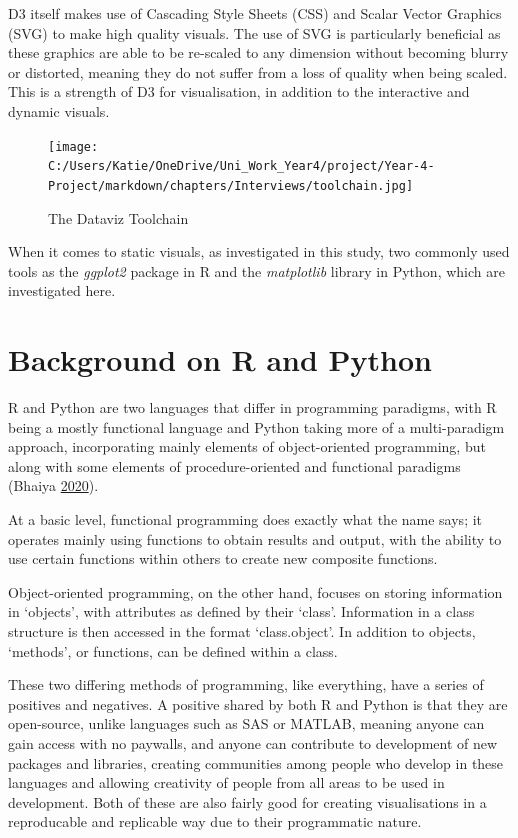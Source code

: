 \documentclass[
  11pt,
]{book}
\begin{document}
D3 itself makes use of Cascading Style Sheets (CSS) and Scalar Vector
Graphics (SVG) to make high quality visuals. The use of SVG is
particularly beneficial as these graphics are able to be re-scaled to
any dimension without becoming blurry or distorted, meaning they do not
suffer from a loss of quality when being scaled. This is a strength of
D3 for visualisation, in addition to the interactive and dynamic
visuals.

\begin{figure}
\centering
\texttt{[image: C:/Users/Katie/OneDrive/Uni\_Work\_Year4/project/Year-4-Project/markdown/chapters/Interviews/toolchain.jpg]}
\caption{The Dataviz Toolchain \label{toolchain}}
\end{figure}

When it comes to static visuals, as investigated in this study, two
commonly used tools as the \textit{ggplot2} package in R and the
\textit{matplotlib} library in Python, which are investigated here.

\section{Background on R and Python}

R and Python are two languages that differ in programming paradigms,
with R being a mostly functional language and Python taking more of a
multi-paradigm approach, incorporating mainly elements of
object-oriented programming, but along with some elements of
procedure-oriented and functional paradigms (Bhaiya
\protect\hyperlink{ref-paradigm}{2020}).

At a basic level, functional programming does exactly what the name
says; it operates mainly using functions to obtain results and output,
with the ability to use certain functions within others to create new
composite functions.

Object-oriented programming, on the other hand, focuses on storing
information in `objects', with attributes as defined by their `class'.
Information in a class structure is then accessed in the format
`class.object'. In addition to objects, `methods', or functions, can be
defined within a class.

These two differing methods of programming, like everything, have a
series of positives and negatives. A positive shared by both R and
Python is that they are open-source, unlike languages such as SAS or
MATLAB, meaning anyone can gain access with no paywalls, and anyone can
contribute to development of new packages and libraries, creating
communities among people who develop in these languages and allowing
creativity of people from all areas to be used in development. Both of
these are also fairly good for creating visualisations in a reproducable
and replicable way due to their programmatic nature.
\end{document}
